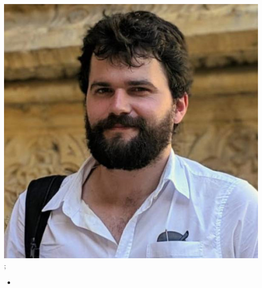 \documentclass[aspectratio=169]{beamer}
\begin{document}
\begin{frame}
{        \includegraphics[width=0.10\textheight]{people/will_handley.jpg}%
    };
    \begin{itemize}
        \item 
    \end{itemize}
\end{frame}
\end{document}

